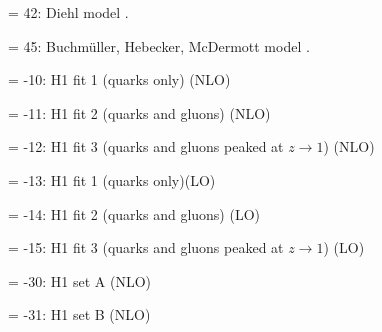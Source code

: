 \documentclass[10pt]{article} \usepackage{dina4}
\newcommand{\deflab}[1]{#1\hfil}%
\newenvironment{defl}[1]%
  {\begin{list}{}{\settowidth{\labelwidth}{#1}%
  \setlength{\leftmargin}{\labelwidth}%
  \addtolength{\leftmargin}{\labelsep}%
  \setlength{\itemsep}{0pt plus 1pt}
  \setlength{\parsep}{0pt plus 1pt}
  \setlength{\topsep}{0pt plus 1pt}
  \setlength{\partopsep}{0pt plus 1pt}
  \setlength{\parskip}{2mm plus 1mm minus 1mm}
  \let\makelabel\deflab}}%
  {\end{list}}
\begin{document}
\begin{defl}{123456789012345}
\item[] = 42: Diehl model \cite{Diehl1,Diehl2}.
\item[] = 45: Buchm\"uller, Hebecker, McDermott model
                              \cite{Buchmuller_Hebecker_Mcdermott}.
\item[] = -10: H1 fit 1 (quarks only) (NLO)\cite{H1_F2D3_97}
\item[] = -11: H1 fit 2 (quarks and gluons) (NLO)\cite{H1_F2D3_97} 
\item[] = -12: H1 fit 3 (quarks and gluons peaked at $z \to 1$)
                        (NLO)\cite{H1_F2D3_97} 
\item[] = -13: H1 fit 1 (quarks only)(LO) \cite{H1_F2D3_97}
\item[] = -14: H1 fit 2 (quarks and gluons) (LO)\cite{H1_F2D3_97} 
\item[] = -15: H1 fit 3 (quarks and gluons peaked at $z \to 1$) 
                        (LO)\cite{H1_F2D3_97} 
\item[] = -30: H1 set A (NLO) \cite{H1_F2D3_06}
\item[] = -31: H1 set B (NLO) \cite{H1_F2D3_06} 


\end{defl}
\end{document}
